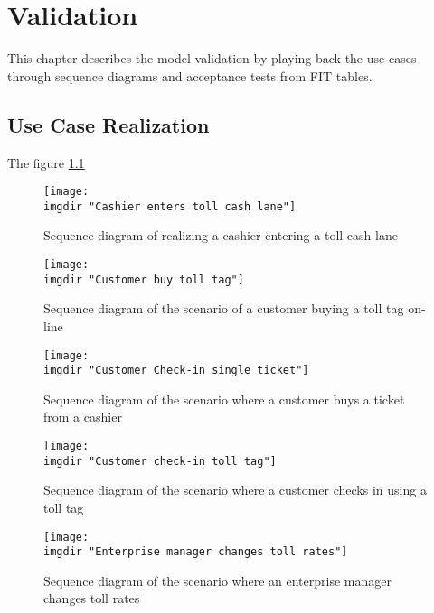 \chapter{Validation}
This chapter describes the model validation by playing back the use cases through sequence diagrams and acceptance tests from FIT tables.
\section{Use Case Realization}
The figure \ref{fig:seq_diag:system_charges_customers}


\begin{figure}
  \texttt{[image: \\imgdir "Cashier enters toll cash lane"]}
  \caption{Sequence diagram of realizing a cashier entering a toll cash lane}
  \label{fig:seq_diag:system_charges_customers}
\end{figure}

\begin{figure}
  \texttt{[image: \\imgdir "Customer buy toll tag"]}
  \caption{Sequence diagram of the scenario of a customer buying a toll tag on-line}
  \label{fig:seq_diag:customer_orders_toll_tag_online}
\end{figure}

\begin{figure}
  \texttt{[image: \\imgdir "Customer Check-in single ticket"]}
  \caption{Sequence diagram of the scenario where a customer buys a ticket from a cashier}
  \label{fig:seq_diag:customer_check_in_single_ticket}
\end{figure}

\begin{figure}
  \texttt{[image: \\imgdir "Customer check-in toll tag"]}
  \caption{Sequence diagram of the scenario where a customer checks in using a toll tag}
  \label{fig:seq_diag:customer_check_in_toll_tag}
\end{figure}

\begin{figure}
  \texttt{[image: \\imgdir "Enterprise manager changes toll rates"]}
  \caption{Sequence diagram of the scenario where an enterprise manager changes toll rates}
  \label{fig:seq_diag:enterprise_manager_changes_toll_rates}
\end{figure}

